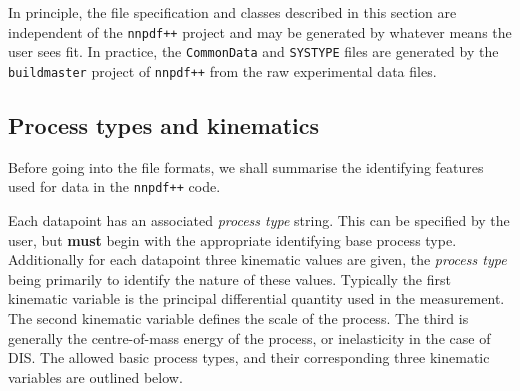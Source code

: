 \documentclass[11pt]{article}
\begin{document}
In principle, the file specification and classes described in this section are
independent of the {\tt nnpdf++} project and may be generated by whatever means
the user sees fit.  In practice, the {\tt CommonData} and {\tt SYSTYPE} files
are generated by the {\tt buildmaster} project of {\tt nnpdf++} from the raw
experimental data files.

\subsection{Process types and kinematics}
Before going into the file formats, we shall summarise the identifying features
used for data in the {\tt nnpdf++} code.

Each datapoint has an associated \emph{process type} string. This can be
specified by the user, but \textbf{must} begin with the appropriate identifying
base process type. Additionally for each datapoint three kinematic values are
given, the \emph{process type} being primarily to identify the nature of these
values. Typically the first kinematic variable is the principal differential
quantity used in the measurement. The second kinematic variable defines the
scale of the process. The third is generally the centre-of-mass energy of the
process, or inelasticity in the case of DIS. The allowed basic process types,
and their corresponding three kinematic variables are outlined below.
\end{document}
